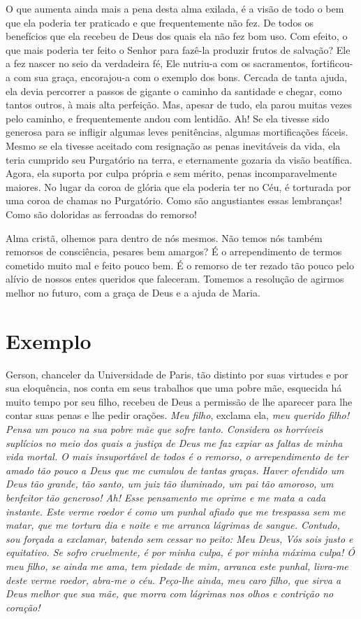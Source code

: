 O que aumenta ainda mais a pena desta alma exilada, é a visão de todo o bem que ela poderia ter praticado e que frequentemente não fez. De todos os benefícios que ela recebeu de Deus dos quais ela não fez bom uso. Com efeito, o que mais poderia ter feito o Senhor para fazê-la produzir frutos de salvação? Ele a fez nascer no seio da verdadeira fé, Ele nutriu-a com os sacramentos, fortificou-a com sua graça, encorajou-a com o exemplo dos bons. Cercada de tanta ajuda, ela devia percorrer a passos de gigante o caminho da santidade e chegar, como tantos outros, à mais alta perfeição. Mas, apesar de tudo, ela parou muitas vezes pelo caminho, e frequentemente andou com lentidão. Ah! Se ela tivesse sido generosa para se infligir algumas leves penitências, algumas mortificações fáceis. Mesmo se ela tivesse aceitado com resignação as penas inevitáveis da vida, ela teria cumprido seu Purgatório na terra, e eternamente gozaria da visão beatífica. Agora, ela suporta por culpa própria e sem mérito, penas incomparavelmente maiores. No lugar da coroa de glória que ela poderia ter no Céu, é torturada por uma coroa de chamas no Purgatório. Como são angustiantes essas lembranças! Como são doloridas as ferroadas do remorso!

Alma cristã, olhemos para dentro de nós mesmos. Não temos nós também remorsos de consciência, pesares bem amargos? É o arrependimento de termos cometido muito mal e feito pouco bem. É o remorso de ter rezado tão pouco pelo alívio de nossos entes queridos que faleceram. Tomemos a resolução de agirmos melhor no futuro, com a graça de Deus e a ajuda de Maria.


\section*{Exemplo}

Gerson, chanceler da Universidade de Paris, tão distinto por suas virtudes e por sua eloquência, nos conta em seus trabalhos que uma pobre mãe, esquecida há muito tempo por seu filho, recebeu de Deus a permissão de lhe aparecer para lhe contar suas penas e lhe pedir orações. \textit{Meu filho}, 
exclama ela, \textit{meu querido filho! Pensa um pouco na sua pobre mãe que sofre tanto. Considera os horríveis suplícios no meio dos quais a justiça de Deus me faz expiar as faltas de minha vida mortal. O mais insuportável de todos é o remorso, o arrependimento de ter amado tão pouco a Deus que me cumulou de tantas graças. Haver ofendido um Deus tão grande, tão santo, um juiz tão iluminado, um pai tão amoroso, um benfeitor tão generoso! Ah! Esse pensamento me oprime e me mata a cada instante. Este verme roedor é como um punhal afiado que me trespassa sem me matar, que me tortura dia e noite e me arranca lágrimas de sangue. Contudo, sou forçada a exclamar, batendo sem cessar no peito: Meu Deus, Vós sois justo e equitativo. Se sofro cruelmente, é por minha culpa, é por minha máxima culpa! Ó meu filho, se ainda me ama, tem piedade de mim, arranca este punhal, livra-me deste verme roedor, abra-me o céu. Peço-lhe ainda, meu caro filho, que sirva a Deus melhor que sua mãe, que morra com lágrimas nos olhos e contrição no coração!}

